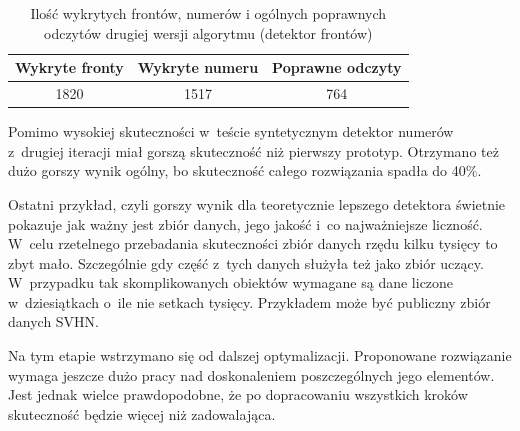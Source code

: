 \begin{table}[!h]
    \centering
    \begin{tabular}{c|c|c}
        Wykryte fronty  & Wykryte numeru & Poprawne odczyty \\ \hline
        1820 & 1517 & 764 
    \end{tabular}
    \caption{Ilość wykrytych frontów, numerów i ogólnych poprawnych 
    odczytów drugiej wersji algorytmu (detektor frontów)}
    \label{tab:upset_second_version_number_detector}
\end{table}

Pomimo wysokiej skuteczności w~teście syntetycznym
detektor numerów z~drugiej iteracji miał gorszą skuteczność
niż pierwszy prototyp. Otrzymano też dużo gorszy wynik
ogólny, bo skuteczność całego rozwiązania spadła do
40\%.

Ostatni przykład, czyli gorszy wynik dla teoretycznie 
lepszego detektora świetnie pokazuje jak ważny jest zbiór
danych, jego jakość i~co najważniejsze liczność. 
W~celu rzetelnego przebadania skuteczności zbiór danych 
rzędu kilku tysięcy to zbyt mało. Szczególnie gdy część 
z~tych danych służyła też jako zbiór uczący.
W~przypadku tak skomplikowanych obiektów wymagane są 
dane liczone w~dziesiątkach o~ile nie setkach tysięcy.
Przykładem może być publiczny zbiór danych SVHN.

Na tym etapie wstrzymano się od dalszej optymalizacji. 
Proponowane rozwiązanie wymaga jeszcze dużo pracy nad 
doskonaleniem poszczególnych jego elementów.
Jest jednak wielce prawdopodobne, że po dopracowaniu 
wszystkich kroków skuteczność będzie więcej niż zadowalająca.
